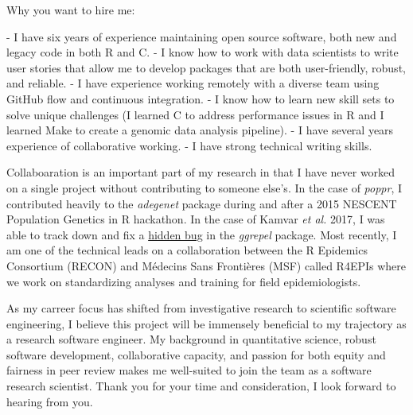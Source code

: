 



Why you want to hire me:

 - I have six years of experience maintaining open source software, both new and
   legacy code in both R and C.
 - I know how to work with data scientists to write user stories that allow me
   to develop packages that are both user-friendly, robust, and reliable.
 - I have experience working remotely with a diverse team using GitHub flow and 
   continuous integration.
 - I know how to learn new skill sets to solve unique challenges (I learned C
   to address performance issues in R and I learned Make to create a genomic
   data analysis pipeline).
 - I have several years experience of collaborative working.
 - I have strong technical writing skills.


\vspace{1ex}

Collaboaration is an important part of my research in that I have never worked
on a single project without contributing to someone else's. In the case of
\textit{poppr}, I contributed heavily to the \textit{adegenet} package during
and after a 2015 NESCENT Population Genetics in R hackathon. In the case of
Kamvar \textit{et al.} 2017, I was able to track down and fix a
\href{https://github.com/slowkow/ggrepel/issues/72}{hidden bug} in the
\textit{ggrepel} package. Most recently, I am one of the technical leads on a
collaboration between the R Epidemics Consortium (RECON) and M\'{e}decins Sans
Fronti\`{e}res (MSF) called R4EPIs where we work on standardizing analyses and
training for field epidemiologists.  

\vspace{1ex}

As my carreer focus has shifted from investigative research to scientific
software engineering, I believe this project will be immensely beneficial to my
trajectory as a research software engineer. My background in quantitative
science, robust software development, collaborative capacity, and passion for
both equity and fairness in peer review makes me well-suited to join the team
as a software research scientist. Thank you for your time and consideration, I
look forward to hearing from you. 

